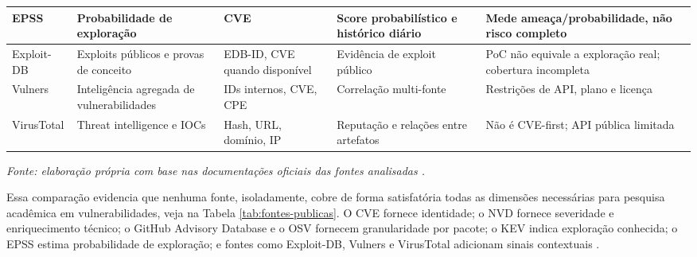 \begin{table}[htbp]
{{\begin{tabular}{|>{\raggedright\arraybackslash}p{2.4cm}|>{\raggedright\arraybackslash}p{2.7cm}|>{\raggedright\arraybackslash}p{2.7cm}|>{\raggedright\arraybackslash}p{2.9cm}|>{\raggedright\arraybackslash}p{3.6cm}|}
                \hline
                EPSS                      & Probabilidade de exploração                                   & CVE                           & Score probabilístico e histórico diário                                    & Mede ameaça/probabilidade, não risco completo                                                           \\
                \hline
                Exploit-DB                & Exploits públicos e provas de conceito                        & EDB-ID, CVE quando disponível & Evidência de exploit público                                               & PoC não equivale a exploração real; cobertura incompleta                                                \\
                \hline
                Vulners                   & Inteligência agregada de vulnerabilidades                     & IDs internos, CVE, CPE        & Correlação multi-fonte                                                     & Restrições de API, plano e licença                                                                      \\
                \hline
                VirusTotal                & Threat intelligence e IOCs                                    & Hash, URL, domínio, IP        & Reputação e relações entre artefatos                                       & Não é CVE-first; API pública limitada                                                                   \\
                \hline
            \end{tabular}%
        }}

    \vspace{0.2cm}
    {\footnotesize\textit{Fonte: elaboração própria com base nas documentações oficiais das fontes analisadas \cite{cve_program_overview,nvd_home,github_advisory_database_docs,github_advisory_database_repo,osv_database,osv_schema,cisa_kev_catalog,first_epss,exploitdb,vulners,vulners_api_docs,virustotal_api_v3}.}}

\end{table}

Essa comparação evidencia que nenhuma fonte, isoladamente, cobre de forma satisfatória todas as dimensões necessárias para pesquisa acadêmica em vulnerabilidades, veja na Tabela \ref{tab:fontes-publicas}. O CVE fornece identidade; o NVD fornece severidade e enriquecimento técnico; o GitHub Advisory Database e o OSV fornecem granularidade por pacote; o KEV indica exploração conhecida; o EPSS estima probabilidade de exploração; e fontes como Exploit-DB, Vulners e VirusTotal adicionam sinais contextuais \cite{cve_program_overview,nvd_home,github_advisory_database_docs,osv_database,osv_schema,cisa_kev_catalog,first_epss,exploitdb,vulners,virustotal_api_v3}.
